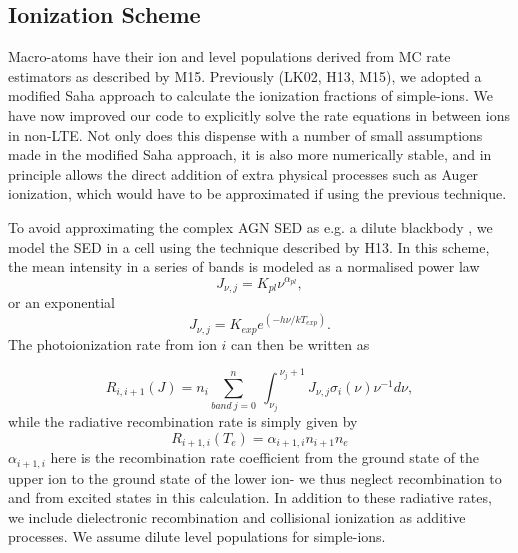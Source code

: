 \documentclass[preprint, a4paper, 11pt]{aastex}
\begin{document}
\subsection{Ionization Scheme}

Macro-atoms have their ion and level populations derived from
MC rate estimators as described by M15. Previously (LK02, H13, M15),
we adopted a modified Saha approach to calculate the ionization fractions
of simple-ions. We have now improved our code to explicitly solve the 
rate equations in between ions in non-LTE. 
Not only does this
dispense with a number of small assumptions made in the modified Saha approach, 
it is also more numerically stable, 
and in principle allows the direct addition of extra physical 
processes such as Auger ionization, which would have to be approximated 
if using the previous technique.

To avoid approximating the complex AGN SED as e.g. a dilute blackbody \citep[][M15]{ML93},
we model the SED in a cell using the technique described by H13. In this scheme,
the mean intensity in a series of bands is modeled as a normalised power law 
\begin{equation}
J_{\nu,j}=K_{pl}\nu^{\alpha_{pl}},
\end{equation}
or an exponential 
\begin{equation}
J_{\nu,j}=K_{exp}e^{(-h\nu/kT_{exp})}.
\end{equation}
The photoionization rate from ion $i$ can then be written as 

\begin{equation}
R_{i,i+1}(J)= 
\displaystyle{n_i \sum_{band~j=0}^{n}}~{\int_{\nu_j}^{~\nu_j+1}{J_{\nu,j}\sigma_i(\nu)\nu^{-1}d\nu}},
\end{equation}
while the radiative recombination rate is simply given by 
\begin{equation}
R_{i+1,i}(T_e) = \alpha_{i+1,i} n_{i+1} n_e
\end{equation}
$\alpha_{i+1,i}$ here is the recombination rate coefficient from the ground state
of the upper ion to the ground state of the lower ion- we thus neglect recombination
to and from excited states in this calculation. In addition to these
radiative rates, we include dielectronic recombination and collisional ionization
as additive processes. We assume dilute level populations 
for simple-ions.

\end{document}
